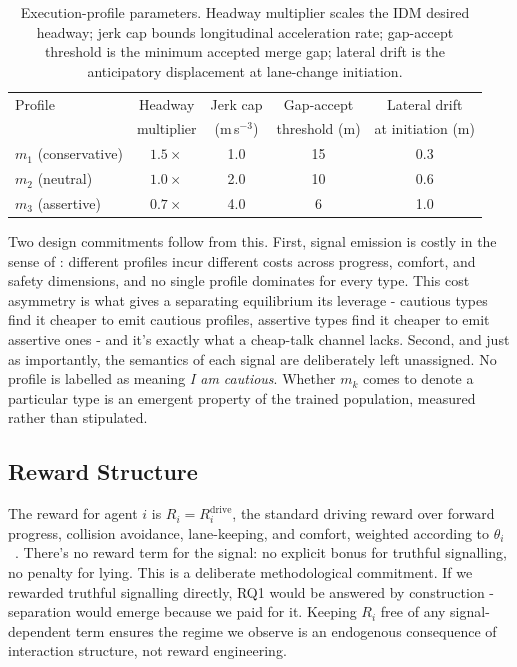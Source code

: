 \documentclass[12pt,a4paper]{article}
\begin{document}
\begin{table}[h]
\centering
\small
\begin{tabular}{lcccc}
\toprule
Profile & Headway & Jerk cap & Gap-accept & Lateral drift \\
        & multiplier & (m\,s$^{-3}$) & threshold (m) & at initiation (m) \\
\midrule
$m_1$ (conservative) & $1.5\times$ & 1.0 & 15 & 0.3 \\
$m_2$ (neutral)      & $1.0\times$ & 2.0 & 10 & 0.6 \\
$m_3$ (assertive)    & $0.7\times$ & 4.0 &  6 & 1.0 \\
\bottomrule
\end{tabular}
\caption{Execution-profile parameters. Headway multiplier scales the IDM desired headway;
jerk cap bounds longitudinal acceleration rate; gap-accept threshold is the minimum accepted
merge gap; lateral drift is the anticipatory displacement at lane-change initiation.}
\label{tab:profiles}
\end{table}

Two design commitments follow from this. First, signal emission is costly in the sense of
\citet{spence1973job}: different profiles incur different costs across progress, comfort, and
safety dimensions, and no single profile dominates for every type. This cost asymmetry is what
gives a separating equilibrium its leverage - cautious types find it cheaper to emit cautious
profiles, assertive types find it cheaper to emit assertive ones - and it's exactly what a
cheap-talk channel lacks. Second, and just as importantly, the semantics of each signal are
deliberately left unassigned. No profile is labelled as meaning \textit{I am cautious}. Whether
$m_k$ comes to denote a particular type is an emergent property of the trained population,
measured rather than stipulated.

\subsection{Reward Structure}

The reward for agent $i$ is $R_i = R^{\mathrm{drive}}_i$, the standard driving reward over
forward progress, collision avoidance, lane-keeping, and comfort, weighted according to
$\theta_i$~\cite{leurent2018environment}. There's no reward term for the signal: no explicit
bonus for truthful signalling, no penalty for lying. This is a deliberate methodological
commitment. If we rewarded truthful signalling directly, RQ1 would be answered by
construction - separation would emerge because we paid for it. Keeping $R_i$ free of any
signal-dependent term ensures the regime we observe is an endogenous consequence of
interaction structure, not reward engineering.
\end{document}
